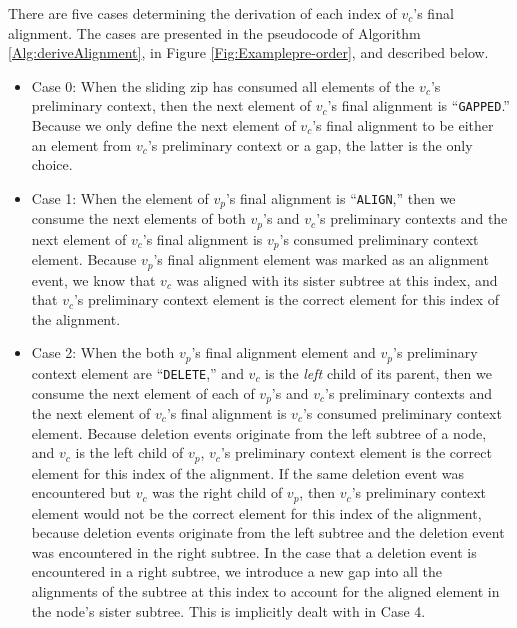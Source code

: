 \documentclass{bmcart}
\begin{document}
There are five cases determining the derivation of each index of $v_c$'s final alignment. The cases are presented in the pseudocode of Algorithm \ref{Alg:deriveAlignment}, in Figure \ref{Fig:Examplepre-order}, and described below.

\begin{itemize}

  \item Case 0: When the sliding zip has consumed all elements of the $v_c$'s preliminary context, then the next element of $v_c$'s final alignment is ``\texttt{GAPPED}.''
  Because we only define the next element of $v_c$'s final alignment to be either an element from $v_c$'s preliminary context or a gap, the latter is the only choice.

  \item Case 1: When the element of $v_p$'s final alignment is ``\texttt{ALIGN},'' then we consume the next elements of both $v_p$'s and $v_c$'s preliminary contexts and the next element of $v_c$'s final alignment is $v_p$'s consumed preliminary context element.
  Because $v_p$'s final alignment element was marked as an alignment event, we know that $v_c$ was aligned with its sister subtree at this index, and that $v_c$'s preliminary context element is the correct element for this index of the alignment.
  
  \item Case 2: When the both $v_p$'s final alignment element and $v_p$'s preliminary context element are ``\texttt{DELETE},'' and $v_c$ is the \textit{left} child of its parent, then we consume the next element of each of $v_p$'s and $v_c$'s preliminary contexts and the next element of $v_c$'s final alignment is $v_c$'s consumed preliminary context element.
  Because deletion events originate from the left subtree of a node, and $v_c$ is the left child of $v_p$, $v_c$'s preliminary context element is the correct element for this index of the alignment.
  If the same deletion event was encountered but $v_c$ was the right child of $v_p$, then $v_c$'s preliminary context element would not be the correct element for this index of the alignment, because deletion events originate from the left subtree and the deletion event was encountered in the right subtree.
  In the case that a deletion event is encountered in a right subtree, we introduce a new gap into all the alignments of the subtree at this index to account for the aligned element in the node's sister subtree.
  This is implicitly dealt with in Case 4.
  

\end{itemize}
\end{document}
